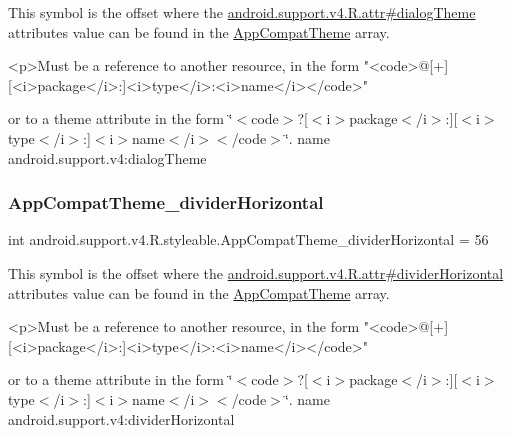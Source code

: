 This symbol is the offset where the \hyperlink{classandroid_1_1support_1_1v4_1_1R_1_1attr_a2a06f7a8c2e9e8a194ded551b48c858b}{android.\+support.\+v4.\+R.\+attr\#dialog\+Theme} attribute\textquotesingle{}s value can be found in the \hyperlink{classandroid_1_1support_1_1v4_1_1R_1_1styleable_ac07ebbe62ed977f6dcaadc6397840ace}{App\+Compat\+Theme} array.

\begin{DoxyVerb}      <p>Must be a reference to another resource, in the form "<code>@[+][<i>package</i>:]<i>type</i>:<i>name</i></code>"
\end{DoxyVerb}
 or to a theme attribute in the form \char`\"{}$<$code$>$?\mbox{[}$<$i$>$package$<$/i$>$\+:\mbox{]}\mbox{[}$<$i$>$type$<$/i$>$\+:\mbox{]}$<$i$>$name$<$/i$>$$<$/code$>$\char`\"{}.  name android.\+support.\+v4\+:dialog\+Theme \mbox{\label{classandroid_1_1support_1_1v4_1_1R_1_1styleable_a4f40263c3e11d2deb92c237d96ea15f0}} 
\subsubsection{\texorpdfstring{App\+Compat\+Theme\+\_\+divider\+Horizontal}{AppCompatTheme\_dividerHorizontal}}
{\footnotesize\ttfamily int android.\+support.\+v4.\+R.\+styleable.\+App\+Compat\+Theme\+\_\+divider\+Horizontal = 56\hspace{0.3cm}{\ttfamily [static]}}

This symbol is the offset where the \hyperlink{classandroid_1_1support_1_1v4_1_1R_1_1attr_aba7557dd9e65f47065970b2ee2447f6d}{android.\+support.\+v4.\+R.\+attr\#divider\+Horizontal} attribute\textquotesingle{}s value can be found in the \hyperlink{classandroid_1_1support_1_1v4_1_1R_1_1styleable_ac07ebbe62ed977f6dcaadc6397840ace}{App\+Compat\+Theme} array.

\begin{DoxyVerb}      <p>Must be a reference to another resource, in the form "<code>@[+][<i>package</i>:]<i>type</i>:<i>name</i></code>"
\end{DoxyVerb}
 or to a theme attribute in the form \char`\"{}$<$code$>$?\mbox{[}$<$i$>$package$<$/i$>$\+:\mbox{]}\mbox{[}$<$i$>$type$<$/i$>$\+:\mbox{]}$<$i$>$name$<$/i$>$$<$/code$>$\char`\"{}.  name android.\+support.\+v4\+:divider\+Horizontal \mbox{\label{classandroid_1_1support_1_1v4_1_1R_1_1styleable_a480131370c6899cceeda9f48459b5bdc}} 
